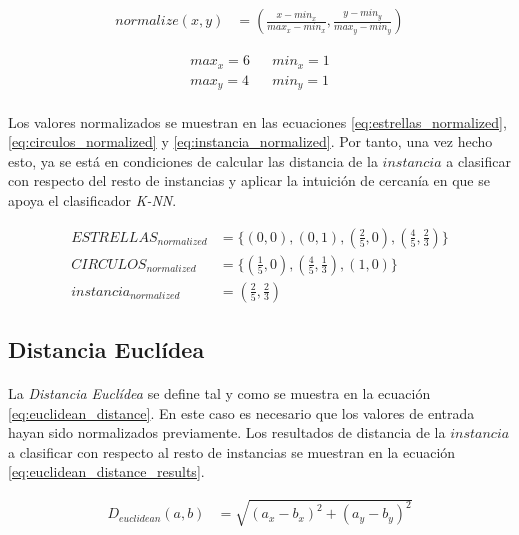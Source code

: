 \documentclass{article}
\begin{document}
		\begin{align}
		\label{eq:normalization}
			normalize(x,y) &= (\frac{x-min_x}{max_x-min_x},\frac{y-min_y}{max_y-min_y})
		\end{align}

		\begin{align}
		\label{eq:max_min_x}
			max_x = 6 && min_x = 1 \\
		\label{eq:max_min_y}
			max_y = 4 && min_y = 1
		\end{align}

		\paragraph{}
		Los valores normalizados se muestran en las ecuaciones \eqref{eq:estrellas_normalized}, \eqref{eq:circulos_normalized} y \eqref{eq:instancia_normalized}. Por tanto, una vez hecho esto, ya se está en condiciones de calcular las distancia de la $instancia$ a clasificar con respecto del resto de instancias y aplicar la intuición de cercanía en que se apoya el clasificador \emph{K-NN}.

		\begin{align}
		\label{eq:estrellas_normalized}
			ESTRELLAS_{normalized} &= \{(0,0), (0,1), (\tfrac{2}{5},0), (\tfrac{4}{5},\tfrac{2}{3})\} \\
		\label{eq:circulos_normalized}
			CIRCULOS_{normalized}  &= \{(\tfrac{1}{5},0), (\tfrac{4}{5},\tfrac{1}{3}), (1,0)\} \\
		\label{eq:instancia_normalized}
			instancia_{normalized}  &= (\tfrac{2}{5},\tfrac{2}{3})
		\end{align}

		\subsection{Distancia Euclídea}
		\label{sec:euclidean}

			\paragraph{}
			La \emph{Distancia Euclídea} se define tal y como se muestra en la ecuación \eqref{eq:euclidean_distance}. En este caso es necesario que los valores de entrada hayan sido normalizados previamente. Los resultados de distancia de la $instancia$ a clasificar con respecto al resto de instancias se muestran en la ecuación \eqref{eq:euclidean_distance_results}.

			\begin{align}
			\label{eq:euclidean_distance}
				D_{euclidean}(a,b) &= \sqrt{(a_x - b_x)^2 + (a_y - b_y)^2}
			\end{align}
\end{document}
